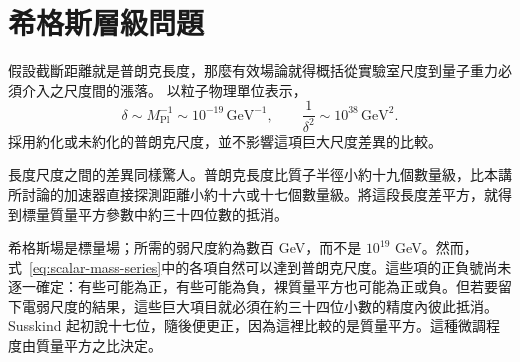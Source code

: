 \begin{classroomqa}
\end{classroomqa}

\begin{classroomqa}
\end{classroomqa}

\section{希格斯層級問題}

假設截斷距離就是普朗克長度，那麼有效場論就得概括從實驗室尺度到量子重力必須介入之尺度間的漲落。
以粒子物理單位表示，
\begin{equation}
\delta\sim M_{\mathrm{Pl}}^{-1}\sim10^{-19}\,\mathrm{GeV}^{-1},
\qquad
\frac{1}{\delta^2}\sim10^{38}\,\mathrm{GeV}^2.
\label{eq:planck-cutoff}
\end{equation}
採用約化或未約化的普朗克尺度，並不影響這項巨大尺度差異的比較。

長度尺度之間的差異同樣驚人。普朗克長度比質子半徑小約十九個數量級，比本講所討論的加速器直接探測距離小約十六或十七個數量級。將這段長度差平方，就得到標量質量平方參數中約三十四位數的抵消。

希格斯場是標量場；所需的弱尺度約為數百 GeV，而不是 \(10^{19}\) GeV。然而，式~\eqref{eq:scalar-mass-series}中的各項自然可以達到普朗克尺度。這些項的正負號尚未逐一確定：有些可能為正，有些可能為負，裸質量平方也可能為正或負。但若要留下電弱尺度的結果，這些巨大項目就必須在約三十四位小數的精度內彼此抵消。Susskind 起初說十七位，隨後便更正，因為這裡比較的是質量平方。這種微調程度由質量平方之比決定。

\begin{classroomqa}
\end{classroomqa}

